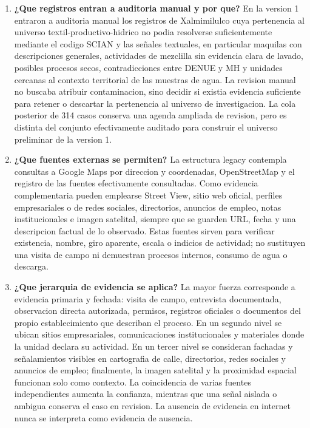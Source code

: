 \documentclass[11pt,letterpaper]{article}
\begin{document}
\begin{enumerate}
    \item \textbf{¿Que registros entran a auditoria manual y por que?}
    En la version 1 entraron a auditoria manual los registros de Xalmimilulco cuya pertenencia al universo textil-productivo-hidrico no podia resolverse suficientemente mediante el codigo SCIAN y las señales textuales, en particular maquilas con descripciones generales, actividades de mezclilla sin evidencia clara de lavado, posibles procesos secos, contradicciones entre DENUE y MH y unidades cercanas al contexto territorial de las muestras de agua. La revision manual no buscaba atribuir contaminacion, sino decidir si existia evidencia suficiente para retener o descartar la pertenencia al universo de investigacion. La cola posterior de 314 casos conserva una agenda ampliada de revision, pero es distinta del conjunto efectivamente auditado para construir el universo preliminar de la version 1.

    \item \textbf{¿Que fuentes externas se permiten?}
    La estructura legacy contempla consultas a Google Maps por direccion y coordenadas, OpenStreetMap y el registro de las fuentes efectivamente consultadas. Como evidencia complementaria pueden emplearse Street View, sitio web oficial, perfiles empresariales o de redes sociales, directorios, anuncios de empleo, notas institucionales e imagen satelital, siempre que se guarden URL, fecha y una descripcion factual de lo observado. Estas fuentes sirven para verificar existencia, nombre, giro aparente, escala o indicios de actividad; no sustituyen una visita de campo ni demuestran procesos internos, consumo de agua o descarga.

    \item \textbf{¿Que jerarquia de evidencia se aplica?}
    La mayor fuerza corresponde a evidencia primaria y fechada: visita de campo, entrevista documentada, observacion directa autorizada, permisos, registros oficiales o documentos del propio establecimiento que describan el proceso. En un segundo nivel se ubican sitios empresariales, comunicaciones institucionales y materiales donde la unidad declara su actividad. En un tercer nivel se consideran fachadas y señalamientos visibles en cartografia de calle, directorios, redes sociales y anuncios de empleo; finalmente, la imagen satelital y la proximidad espacial funcionan solo como contexto. La coincidencia de varias fuentes independientes aumenta la confianza, mientras que una señal aislada o ambigua conserva el caso en revision. La ausencia de evidencia en internet nunca se interpreta como evidencia de ausencia.


\end{enumerate}
\end{document}
